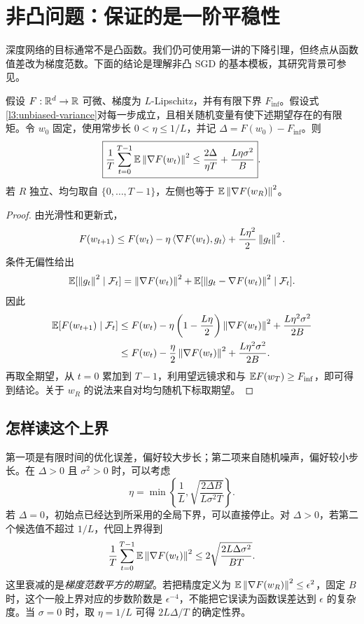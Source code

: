 \section{非凸问题：保证的是一阶平稳性}
\label{l3:nonconvex}

深度网络的目标通常不是凸函数。我们仍可使用第一讲的下降引理，但终点从函数值差改为梯度范数。下面的结论是理解非凸 SGD 的基本模板，其研究背景可参见\citet{Ghadimi2013}。

\begin{theorem}
假设 $F:\mathbb R^d\to\mathbb R$ 可微、梯度为 $L$-Lipschitz，并有有限下界 $F_{\inf}$。假设式\eqref{l3:unbiased-variance}对每一步成立，且相关随机变量有使下述期望存在的有限矩。令 $w_0$ 固定，使用常步长 $0<\eta\leq1/L$，并记 $\Delta=F(w_0)-F_{\inf}$。则
\begin{equation}
 \boxed{\frac1T\sum_{t=0}^{T-1}\mathbb E\left\lVert\nabla F(w_t)\right\rVert^2
 \leq\frac{2\Delta}{\eta T}+\frac{L\eta\sigma^2}{B}}.
 \label{l3:stationarity-bound}
\end{equation}
若 $R$ 独立、均匀取自 $\{0,\ldots,T-1\}$，左侧也等于
$\mathbb E\left\lVert\nabla F(w_R)\right\rVert^2$。
\end{theorem}
\begin{proof}
由光滑性和更新式，
\[
 F(w_{t+1})\leq F(w_t)-\eta\left\langle\nabla F(w_t),g_t\right\rangle
 +\frac{L\eta^2}{2}\left\lVert g_t\right\rVert^2.
\]
条件无偏性给出
\[
 \mathbb E[\left\lVert g_t\right\rVert^2\mid\mathcal F_t]
 =\left\lVert\nabla F(w_t)\right\rVert^2+
 \mathbb E[\left\lVert g_t-\nabla F(w_t)\right\rVert^2\mid\mathcal F_t].
\]
因此
\begin{align}
 \mathbb E[F(w_{t+1})\mid\mathcal F_t]
 &\leq F(w_t)-\eta\left(1-\frac{L\eta}{2}\right)
 \left\lVert\nabla F(w_t)\right\rVert^2+\frac{L\eta^2\sigma^2}{2B}\notag\\
 &\leq F(w_t)-\frac\eta2\left\lVert\nabla F(w_t)\right\rVert^2
 +\frac{L\eta^2\sigma^2}{2B}.
 \label{l3:conditional-descent}
\end{align}
再取全期望，从 $t=0$ 累加到 $T-1$，利用望远镜求和与
$\mathbb E F(w_T)\geq F_{\inf}$，即可得到结论。关于 $w_R$ 的说法来自对均匀随机下标取期望。
\end{proof}

\subsection{怎样读这个上界}

第一项是有限时间的优化误差，偏好较大步长；第二项来自随机噪声，偏好较小步长。在 $\Delta>0$ 且 $\sigma^2>0$ 时，可以考虑
\begin{equation}
 \eta=\min\left\{\frac1L,
 \sqrt{\frac{2\Delta B}{L\sigma^2T}}\right\}.
 \label{l3:balanced-step}
\end{equation}
若 $\Delta=0$，初始点已经达到所采用的全局下界，可以直接停止。对 $\Delta>0$，若第二个候选值不超过 $1/L$，代回上界得到
\begin{equation}
 \frac1T\sum_{t=0}^{T-1}\mathbb E\left\lVert\nabla F(w_t)\right\rVert^2
 \leq2\sqrt{\frac{2L\Delta\sigma^2}{BT}}.
 \label{l3:balanced-rate}
\end{equation}
这里衰减的是\emph{梯度范数平方的期望}。若把精度定义为
$\mathbb E\left\lVert\nabla F(w_R)\right\rVert^2\leq\epsilon^2$，固定 $B$ 时，这个一般上界对应的步数阶数是 $\epsilon^{-4}$，不能把它误读为函数误差达到 $\epsilon$ 的复杂度。当 $\sigma=0$ 时，取 $\eta=1/L$ 可得 $2L\Delta/T$ 的确定性界。

